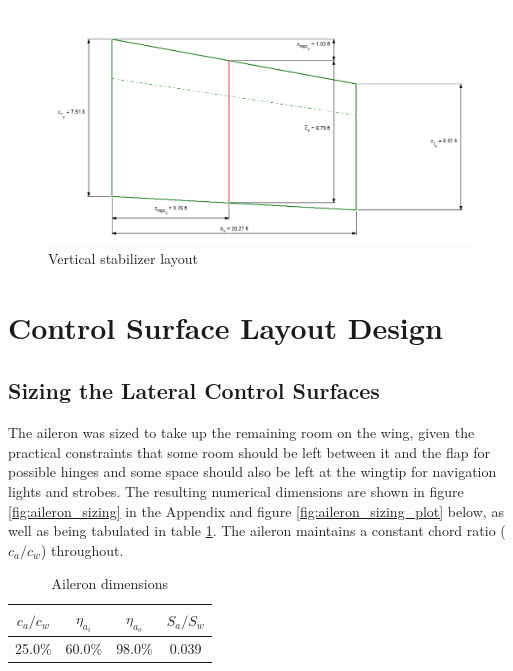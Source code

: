 \documentclass[conf]{new-aiaa}
\begin{document}
\begin{figure}[H]
    \includegraphics[width=\textwidth]{Report3Printouts/Empannage/Vertical_geometry_plot.png}
    \caption{Vertical stabilizer layout}
    \label{fig:vertical_geometry_plot}
\end{figure}


\section{Control Surface Layout Design}
\subsection{Sizing the Lateral Control Surfaces}

The aileron was sized to take up the remaining room on the wing, given the practical constraints that some room should be left between it and the flap for possible hinges and some space should also be left at the wingtip for navigation lights and strobes. The resulting numerical dimensions are shown in figure \ref{fig:aileron_sizing} in the Appendix and figure \ref{fig:aileron_sizing_plot} below, as well as being tabulated in table \ref{tab:aileron_size_table}. The aileron maintains a constant chord ratio ($c_a/c_w$) throughout.

\begin{table}[H]
\centering
\caption{Aileron dimensions}
\begin{tabular}{|c|c|c|c|}\hline
    $c_a/c_w$ & $\eta_{a_i}$ & $\eta_{a_o}$ & $S_a/S_w$ \\ \hline
    25.0\%    & 60.0\%     & 98.0\%     & 0.039     \\ \hline
\end{tabular}
\label{tab:aileron_size_table}
\end{table}
\end{document}
